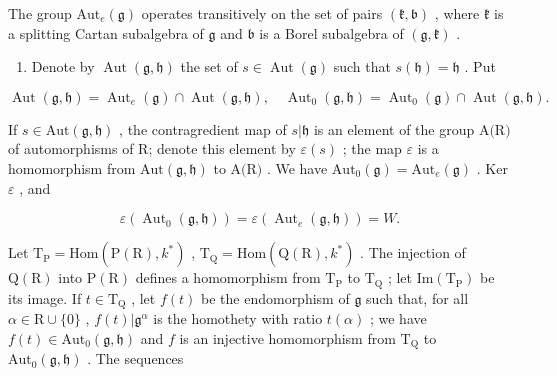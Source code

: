 The group \(\mathrm{Aut}_e(\mathfrak{g})\) operates transitively on the set of pairs \((\mathfrak{k},\mathfrak{b})\) , where \(\mathfrak{k}\) is a splitting Cartan subalgebra of \(\mathfrak{g}\) and \(\mathfrak{b}\) is a Borel subalgebra of \((\mathfrak{g},\mathfrak{k})\) .

\begin{enumerate}
\def\labelenumi{\arabic{enumi})}
\setcounter{enumi}{17}
\tightlist
\item
  Denote by \(\operatorname{Aut}(\mathfrak{g},\mathfrak{h})\) the set of \(s\in \operatorname{Aut}(\mathfrak{g})\) such that \(s(\mathfrak{h}) = \mathfrak{h}\) . Put
\end{enumerate}

\[
\operatorname{Aut} (\mathfrak {g}, \mathfrak {h}) = \operatorname{Aut} _ {e} (\mathfrak {g}) \cap \operatorname{Aut} (\mathfrak {g}, \mathfrak {h}), \quad \operatorname{Aut} _ {0} (\mathfrak {g}, \mathfrak {h}) = \operatorname{Aut} _ {0} (\mathfrak {g}) \cap \operatorname{Aut} (\mathfrak {g}, \mathfrak {h}).
\]

If \(s \in \text{Aut}(\mathfrak{g}, \mathfrak{h})\) , the contragredient map of \(s | \mathfrak{h}\) is an element of the group \(\text{A(R)}\) of automorphisms of R; denote this element by \(\varepsilon(s)\) ; the map \(\varepsilon\) is a homomorphism from \(\text{Aut}(\mathfrak{g}, \mathfrak{h})\) to \(\text{A(R)}\) . We have \(\text{Aut}_{0}(\mathfrak{g}) = \text{Aut}_{e}(\mathfrak{g})\) . Ker \(\varepsilon\) , and

\[
\varepsilon (\operatorname{Aut} _ {0} (\mathfrak {g}, \mathfrak {h})) = \varepsilon (\operatorname{Aut} _ {e} (\mathfrak {g}, \mathfrak {h})) = W.
\]

Let \(\mathrm{T}_{\mathrm{P}} = \mathrm{Hom}(\mathrm{P}(\mathrm{R}), k^{*})\) , \(\mathrm{T}_{\mathrm{Q}} = \mathrm{Hom}(\mathrm{Q}(\mathrm{R}), k^{*})\) . The injection of \(\mathrm{Q}(\mathrm{R})\) into \(\mathrm{P}(\mathrm{R})\) defines a homomorphism from \(\mathrm{T}_{\mathrm{P}}\) to \(\mathrm{T}_{\mathrm{Q}}\) ; let \(\mathrm{Im}(\mathrm{T}_{\mathrm{P}})\) be its image. If \(t \in \mathrm{T}_{\mathrm{Q}}\) , let \(f(t)\) be the endomorphism of \(\mathfrak{g}\) such that, for all \(\alpha \in \mathrm{R} \cup \{0\}\) , \(f(t)|\mathfrak{g}^{\alpha}\) is the homothety with ratio \(t(\alpha)\) ; we have \(f(t)\in \mathrm{Aut}_{0}(\mathfrak{g},\mathfrak{h})\) and \(f\) is an injective homomorphism from \(\mathrm{T}_{\mathrm{Q}}\) to \(\mathrm{Aut}_0(\mathfrak{g},\mathfrak{h})\) . The sequences

